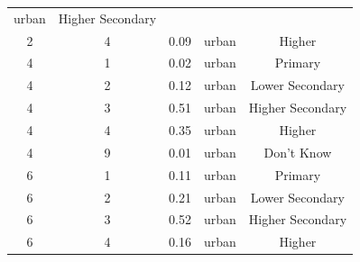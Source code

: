 \documentclass[stu, 12pt, floatsintext,longtable]{apa7}
\begin{document}
\begin{longtable}{ccccc}
    urban                                              & Higher Secondary
    \\
    2                                                  & 4                    &
    0.09                                               &
    urban                                              & Higher
    \\
    4                                                  & 1                    &
    0.02                                               &
    urban                                              & Primary
    \\
    4                                                  & 2                    &
    0.12                                               &
    urban                                              & Lower Secondary
    \\
    4                                                  & 3                    &
    0.51                                               &
    urban                                              & Higher Secondary
    \\
    4                                                  & 4                    &
    0.35                                               &
    urban                                              & Higher
    \\
    4                                                  & 9                    &
    0.01                                               &
    urban                                              & Don't Know
    \\
    6                                                  & 1                    &
    0.11                                               &
    urban                                              & Primary
    \\
    6                                                  & 2                    &
    0.21                                               &
    urban                                              & Lower Secondary
    \\
    6                                                  & 3                    &
    0.52                                               &
    urban                                              & Higher Secondary
    \\
    6                                                  & 4                    &
    0.16                                               &
    urban                                              & Higher
    \\

\end{longtable}
\end{document}
